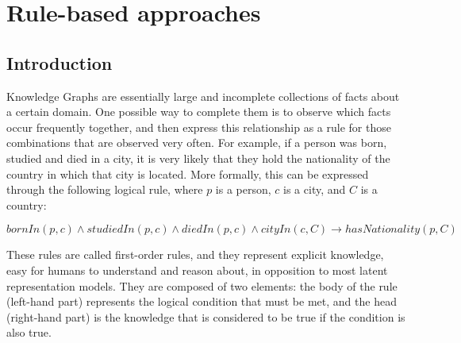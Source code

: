 \chapter{Rule-based approaches}\label{chap:rules}



\section{Introduction}\label{sec:rule-intro}
Knowledge Graphs are essentially large and incomplete collections of facts about a certain domain. One possible way to complete them is to observe which facts occur frequently together, and then express this relationship as a rule for those combinations that are observed very often. For example, if a person was born, studied and died in a city, it is very likely that they hold the nationality of the country in which that city is located. More formally, this can be expressed through the following logical rule, where $p$ is a person, $c$ is a city, and $C$ is a country:

\[
bornIn(p, c) \wedge studiedIn(p, c) \wedge diedIn(p, c) \wedge cityIn(c, C) \rightarrow hasNationality(p, C)
\]

These rules are called first-order rules, and they represent explicit knowledge, easy for humans to understand and reason about, in opposition to most latent representation models. They are composed of two elements: the body of the rule (left-hand part) represents the logical condition that must be met, and the head (right-hand part) is the knowledge that is considered to be true if the condition is also true.

